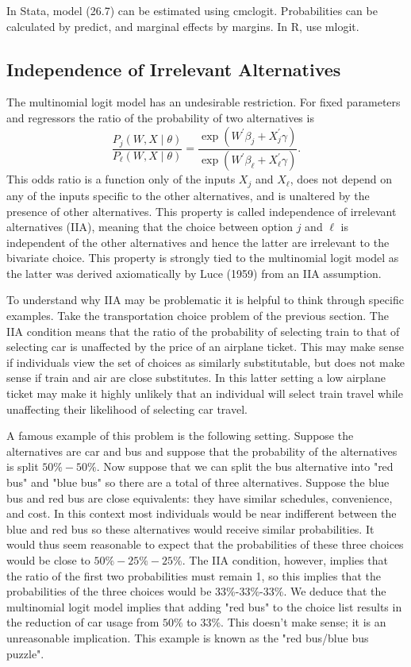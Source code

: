 \documentclass[10pt]{article}
\begin{document}
In Stata, model (26.7) can be estimated using cmclogit. Probabilities can be calculated by predict, and marginal effects by margins. In R, use mlogit.

\subsection{Independence of Irrelevant Alternatives}
The multinomial logit model has an undesirable restriction. For fixed parameters and regressors the ratio of the probability of two alternatives is
$$
\frac{P_{j}(W, X \mid \theta)}{P_{\ell}(W, X \mid \theta)}=\frac{\exp \left(W^{\prime} \beta_{j}+X_{j}^{\prime} \gamma\right)}{\exp \left(W^{\prime} \beta_{\ell}+X_{\ell}^{\prime} \gamma\right)} .
$$
This odds ratio is a function only of the inputs $X_{j}$ and $X_{\ell}$, does not depend on any of the inputs specific to the other alternatives, and is unaltered by the presence of other alternatives. This property is called independence of irrelevant alternatives (IIA), meaning that the choice between option $j$ and $\ell$ is independent of the other alternatives and hence the latter are irrelevant to the bivariate choice. This property is strongly tied to the multinomial logit model as the latter was derived axiomatically by Luce (1959) from an IIA assumption.

To understand why IIA may be problematic it is helpful to think through specific examples. Take the transportation choice problem of the previous section. The IIA condition means that the ratio of the probability of selecting train to that of selecting car is unaffected by the price of an airplane ticket. This may make sense if individuals view the set of choices as similarly substitutable, but does not make sense if train and air are close substitutes. In this latter setting a low airplane ticket may make it highly unlikely that an individual will select train travel while unaffecting their likelihood of selecting car travel.

A famous example of this problem is the following setting. Suppose the alternatives are car and bus and suppose that the probability of the alternatives is split $50 \%-50 \%$. Now suppose that we can split the bus alternative into "red bus" and "blue bus" so there are a total of three alternatives. Suppose the blue bus and red bus are close equivalents: they have similar schedules, convenience, and cost. In this context most individuals would be near indifferent between the blue and red bus so these alternatives would receive similar probabilities. It would thus seem reasonable to expect that the probabilities of these three choices would be close to $50 \%-25 \%-25 \%$. The IIA condition, however, implies that the ratio of the first two probabilities must remain 1, so this implies that the probabilities of the three choices would be 33\%-33\%-33\%. We deduce that the multinomial logit model implies that adding "red bus" to the choice list results in the reduction of car usage from $50 \%$ to $33 \%$. This doesn't make sense; it is an unreasonable implication. This example is known as the "red bus/blue bus puzzle".
\end{document}
